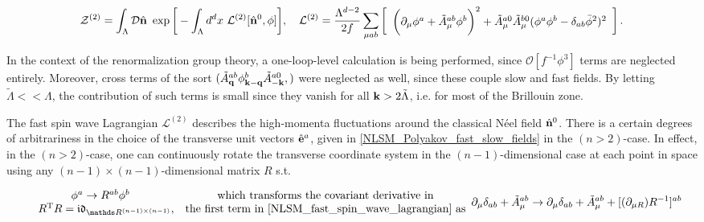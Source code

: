 \begin{itemize}
    \begin{equation}
        \mathcal{Z}^{(2)} = \int_{{\Lambda}} \mathcal{D} \hat{\bf n} \textnormal{ } \exp 
        \bigg[
            - \int_{\Lambda} d^d x \textnormal{ } \mathcal{L}^{(2)}[\hat{\bf n}^{0}, \phi]
        \bigg], 
        \quad 
        \mathcal{L}^{(2)} = 
        \frac{\Lambda^{d-2}}{2f}  
            \sum_{\mu ab} 
            \left[
                \begin{array}{cc}
                     \bigg(
                        \partial_{\mu} \phi^a 
                        + 
                        \tilde{A}^{a b}_{\mu} \phi^b 
                    \bigg)^2 + 
                     \tilde{A}^{a0}_{\mu}   \tilde{A}^{b0}_{\mu} 
                    (
                      \phi^a \phi^b - \delta_{ab} \bar{\phi}^2
                        )^2
                \end{array}
            \right].
            \label{NLSM_fast_spin_wave_lagrangian}
    \end{equation}
    
    In the context of the renormalization group theory, a one-loop-level calculation is being performed, since $\mathcal{O}[f^{-1} \phi^3]$ terms are neglected entirely. 
    Moreover, cross terms of the sort $
    (
    \tilde{A}_{{\bf q}}^{ab} \phi^{b}_{\bf k-q} \tilde{A}_{-{\bf k}}^{a0},
    )$ were neglected as well, since these couple slow and fast fields. 
    By letting $\tilde{\Lambda} << \Lambda$, the contribution of such terms is small since they vanish for all ${\bf k} > 2\tilde{\Lambda}$, i.e. for most of the Brillouin zone. \medbreak
    
    The fast spin wave Lagrangian $\mathcal{L}^{(2)}$ describes the high-momenta fluctuations around the classical Néel field ${\hat{{\bf n}}}^{0}$. 
    There is a certain degrees of arbitrariness in the choice of the transverse unit vectors $\hat{\bf e}^a$, given in \cref{NLSM_Polyakov_fast_slow_fields} in the $(n>2)$-case. In effect, in the $(n>2)$-case, one can continuously rotate the transverse coordinate system in the $(n-1)$-dimensional case at each point in space using any $(n-1)\times(n-1)$-dimensional matrix $R$ s.t. 
    
    \begin{equation} \label{NLSM_gauge_symmetry}
        \begin{array}{cc}
             \phi^a \rightarrow R^{ab} \phi^b \\
             \quad R^{\textnormal{T}} R = \mathfrak{i}\mathfrak{d}_{\R^{(n-1)\times(n-1)}}, 
        \end{array}
        \begin{array}{cc}
             \textnormal{which transforms the covariant derivative in}  \\
             \textnormal{the first term in \cref{NLSM_fast_spin_wave_lagrangian} as}
        \end{array} \partial_{\mu} \delta_{ab} + \tilde{A}_{\mu}^{ab} \rightarrow \partial_{\mu} \delta_{ab} + \tilde{A}_{\mu}^{ab} + [(\partial_{\mu R})R^{-1}]^{ab}
    \end{equation}
    

\end{itemize}
